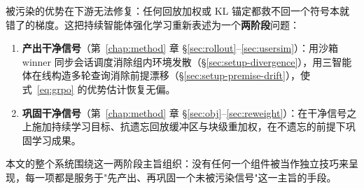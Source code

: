 被污染的优势在下游无法修复：任何回放加权或 KL 锚定都救不回一个符号本就错了的梯度。这把持续智能体强化学习重新表述为一个\textbf{两阶段}问题：

\begin{enumerate}
  \item \textbf{产出干净信号}（第~\ref{chap:method} 章 \S\ref{sec:rollout}--\ref{sec:usersim}）：用沙箱 winner 同步会话调度消除组内环境发散（\S\ref{sec:setup-divergence}），用三智能体在线构造多轮查询消除前提漂移（\S\ref{sec:setup-premise-drift}），使式~\eqref{eq:grpo} 的优势估计恢复无偏。
  \item \textbf{巩固干净信号}（第~\ref{chap:method} 章 \S\ref{sec:obj}--\ref{sec:reweight}）：在干净信号之上施加持续学习目标、抗遗忘回放缓冲区与块级重加权，在不遗忘的前提下巩固学习成果。
\end{enumerate}

本文的整个系统围绕这一两阶段主旨组织：没有任何一个组件被当作独立技巧来呈现，每一项都是服务于"先产出、再巩固一个未被污染信号"这一主旨的手段。
